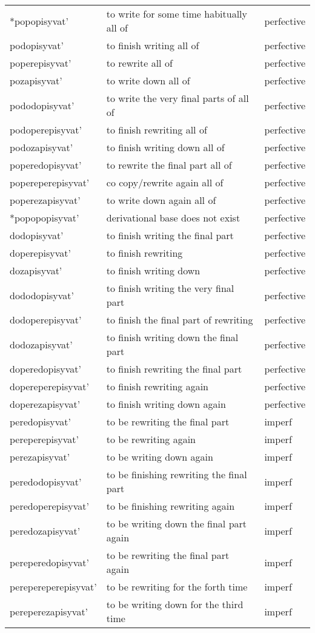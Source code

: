 \begin{longtable}{lll}
*popopisyvat' & to write for some time habitually all of & perfective \\ 
podopisyvat' & to finish writing all of & perfective \\ 
poperepisyvat' & to rewrite all of & perfective \\ 
pozapisyvat' & to write down all of & perfective \\ 
pododopisyvat' & to write the very final parts of all of  & perfective \\ 
podoperepisyvat' & to finish rewriting all of  & perfective \\ 
podozapisyvat' & to finish writing down all of  & perfective \\ 
poperedopisyvat' & to rewrite the final part all of  & perfective \\ 
popereperepisyvat' & co copy/rewrite again all of  & perfective \\ 
poperezapisyvat' & to write down again all of & perfective \\  
*popopopisyvat' & derivational base does not exist & perfective\\  \midrule

dodopisyvat' & to finish writing the final part & perfective \\ 
doperepisyvat' & to finish rewriting & perfective \\ 
dozapisyvat' & to finish writing down & perfective \\ 
dododopisyvat' & to finish writing the very final part & perfective \\ 
dodoperepisyvat' & to finish the final part of rewriting   & perfective \\ 
dodozapisyvat' & to finish writing down the final part  & perfective \\ 
doperedopisyvat' & to finish rewriting the final part  & perfective \\ 
dopereperepisyvat' & to finish rewriting again & perfective \\ 
doperezapisyvat' & to finish writing down again & perfective \\  \midrule

peredopisyvat' & to be rewriting the final part & imperf \\ 
pereperepisyvat' & to be rewriting again & imperf\\ 
perezapisyvat' & to be writing down again & imperf\\ 
peredodopisyvat' & to be finishing rewriting the final part & imperf\\ 
peredoperepisyvat' & to be finishing rewriting  again & imperf\\ 
peredozapisyvat' & to be writing down the final part again & imperf \\ 
pereperedopisyvat' & to be rewriting the final part again & imperf \\ 
perepereperepisyvat' & to be rewriting for the forth time & imperf \\ 
pereperezapisyvat' & to be writing down for the third time & imperf \\  \midrule


\end{longtable}
